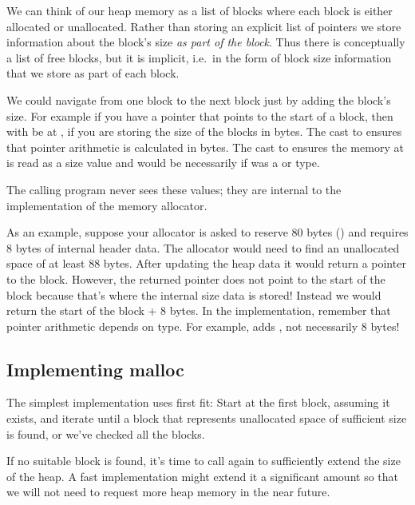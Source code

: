 We can think of our heap memory as a list of blocks where each block is either allocated or unallocated. Rather than storing an explicit list of pointers we store information about the block's size \emph{as part of the block}. Thus there is conceptually a list of free blocks, but it is implicit, i.e.~in the form of block size information that we store as part of each block.

We could navigate from one block to the next block just by adding the block's size. For example if you have a pointer  that points to the start of a block, then  with be at , if you are storing the size of the blocks in bytes. The cast to  ensures that pointer arithmetic is calculated in bytes. The cast to  ensures the memory at  is read as a size value and would be necessarily if  was a  or  type.

The calling program never sees these values; they are internal to the implementation of the memory allocator.

As an example, suppose your allocator is asked to reserve 80 bytes () and requires 8 bytes of internal header data. The allocator would need to find an unallocated space of at least 88 bytes. After updating the heap data it would return a pointer to the block. However, the returned pointer does not point to the start of the block because that's where the internal size data is stored! Instead we would return the start of the block + 8 bytes. In the implementation, remember that pointer arithmetic depends on type. For example,  adds , not necessarily 8 bytes!

\subsection{Implementing malloc}

The simplest implementation uses first fit: Start at the first block, assuming it exists, and iterate until a block that represents unallocated space of sufficient size is found, or we've checked all the blocks.

If no suitable block is found, it's time to call  again to sufficiently extend the size of the heap. A fast implementation might extend it a significant amount so that we will not need to request more heap memory in the near future.

